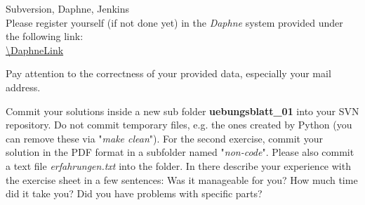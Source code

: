  Subversion, Daphne, Jenkins \\
Please register yourself (if not done yet) in the \textit{Daphne} system provided under the following
link:\\
\url{\DaphneLink}

Pay attention to the correctness of your provided data, especially your mail
address.

Commit your solutions inside a new sub folder
\textbf{uebungsblatt\_01} into your SVN repository. Do not commit temporary files, e.g. the ones created by Python (you can remove these via "\textit{make clean}").
For the second exercise, commit your solution in the PDF format in a subfolder named "\textit{non-code}".
Please also commit a text file \textit{erfahrungen.txt} into the folder. In there describe your experience with the exercise sheet in a few sentences:
Was it manageable for you?
How much time did it take you?
Did you have problems with specific parts?

